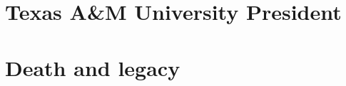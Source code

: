 \documentclass[12pt]{article}
\begin{document}
\newpage
\section{Texas A\&M University President}

\newpage
\section{Death and legacy}

\newpage
\printbibliography

\end{document}
